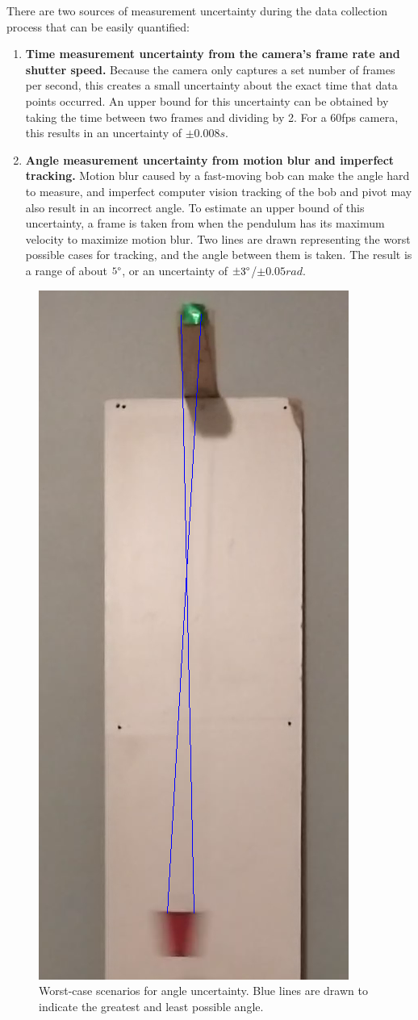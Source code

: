 \documentclass[aps,twocolumn,secnumarabic,nobalancelastpage,amsmath,amssymb,nofootinbib,letterpaper]{revtex4}
\begin{document}
There are two sources of measurement uncertainty during the data collection process that can be easily quantified:
\begin{enumerate}
    \item \textbf{Time measurement uncertainty from the camera's frame rate and shutter speed.} Because the camera only
          captures a set number of frames per second, this creates a small uncertainty about the exact time that data
          points occurred. An upper bound for this uncertainty can be obtained by taking the time between two frames and
          dividing by 2. For a 60fps camera, this results in an uncertainty of \(\pm 0.008\si{s}\).
    \item \textbf{Angle measurement uncertainty from motion blur and imperfect tracking.} Motion blur caused by a
          fast-moving bob can make the angle hard to measure, and imperfect computer vision tracking of the bob and
          pivot may also result in an incorrect angle. To estimate an upper bound of this uncertainty, a frame is taken
          from when the pendulum has its maximum velocity to maximize motion blur. Two lines are drawn representing the
          worst possible cases for tracking, and the angle between them is taken. The result is a range of about
          \(5\degree\), or an uncertainty of \(\pm 3\degree\)/\(\pm 0.05\si{rad}\).
\end{enumerate}
\begin{figure}[h]
    \includegraphics[width=0.3\linewidth]{uncert1.png}
    \caption{Worst-case scenarios for angle uncertainty. Blue lines are drawn to indicate the greatest and least
        possible angle.}
\end{figure}
\end{document}
